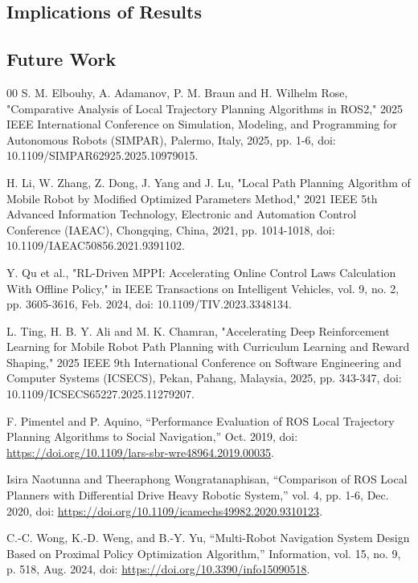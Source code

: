 \documentclass[conference]{IEEEtran}
\begin{document}
    \subsection{Implications of Results}
    

    \subsection{Future Work}
    

\newpage
\begin{thebibliography}{00}
 S. M. Elbouhy, A. Adamanov, P. M. Braun and H. Wilhelm Rose, "Comparative Analysis of Local Trajectory Planning Algorithms in ROS2," 2025 IEEE International Conference on Simulation, Modeling, and Programming for Autonomous Robots (SIMPAR), Palermo, Italy, 2025, pp. 1-6, doi: 10.1109/SIMPAR62925.2025.10979015.

 H. Li, W. Zhang, Z. Dong, J. Yang and J. Lu, "Local Path Planning Algorithm of Mobile Robot by Modified Optimized Parameters Method," 2021 IEEE 5th Advanced Information Technology, Electronic and Automation Control Conference (IAEAC), Chongqing, China, 2021, pp. 1014-1018, doi: 10.1109/IAEAC50856.2021.9391102.

 Y. Qu et al., "RL-Driven MPPI: Accelerating Online Control Laws Calculation With Offline Policy," in IEEE Transactions on Intelligent Vehicles, vol. 9, no. 2, pp. 3605-3616, Feb. 2024, doi: 10.1109/TIV.2023.3348134.

 L. Ting, H. B. Y. Ali and M. K. Chamran, "Accelerating Deep Reinforcement Learning for Mobile Robot Path Planning with Curriculum Learning and Reward Shaping," 2025 IEEE 9th International Conference on Software Engineering and Computer Systems (ICSECS), Pekan, Pahang, Malaysia, 2025, pp. 343-347, doi: 10.1109/ICSECS65227.2025.11279207.

 F. Pimentel and P. Aquino, “Performance Evaluation of ROS Local Trajectory Planning Algorithms to Social Navigation,” Oct. 2019, doi: \url{https://doi.org/10.1109/lars-sbr-wre48964.2019.00035}.

 Isira Naotunna and Theeraphong Wongratanaphisan, “Comparison of ROS Local Planners with Differential Drive Heavy Robotic System,” vol. 4, pp. 1-6, Dec. 2020, doi: \url{https://doi.org/10.1109/icamechs49982.2020.9310123}.

 C.-C. Wong, K.-D. Weng, and B.-Y. Yu, “Multi-Robot Navigation System Design Based on Proximal Policy Optimization Algorithm,” Information, vol. 15, no. 9, p. 518, Aug. 2024, doi: \url{https://doi.org/10.3390/info15090518}.


\end{thebibliography}
\end{document}
